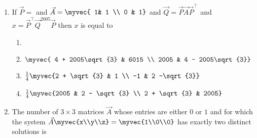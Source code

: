 \begin{enumerate}[label=\thesubsection.\arabic*.,ref=\thesubsection.\theenumi]
\begin{enumerate}
        \end{enumerate}
%
    \item If $\vec{P}=$ 
         and $\vec{A} = \myvec{ 1& 1 \\ 0 & 1}$ and $\vec{Q} = \vec{P}\vec{A}\vec{P}^{\top}$ and $x=\vec{P}^{\top}\vec{Q}^{2005}\vec{P}$ then $x$ is equal to 
%
            \begin{enumerate}
                \item {}
                \item $\myvec{ 4 + 2005\sqrt{3} & 6015 \\ 2005 & 4 - 2005\sqrt{3}}$
                \item $\frac{1}{4}\myvec{2 + \sqrt{3} & 1 \\ -1 & 2 -\sqrt{3}}$
                \item $\frac{1}{4}\myvec{2005 & 2 - \sqrt{3} \\ 2 + \sqrt{3} & 2005}$
            \end{enumerate}		
            \item The number of $3 \times 3$ matrices $\vec{A}$ whose entries are either $0$ or $1$ and for which the system $\vec{A}\myvec{x\\y\\z}=\myvec{1\\0\\0}$ has exactly two distinct solutions is \hfill{}
%
                \begin{enumerate}
\end{enumerate}
\end{enumerate}
